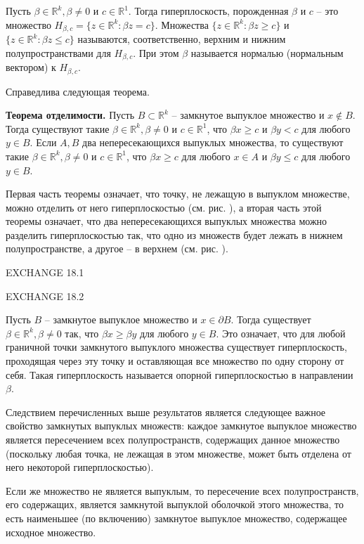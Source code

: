 Пусть $\beta\in\mathbb{R}^k, \beta\neq0$ и $c\in\mathbb{R}^1$. Тогда
гиперплоскость, порожденная $\beta$ и $c$ -- это множество
$H_{\beta,c}=\{z\in\mathbb{R}^k: \beta z=c\}$.
Множества $\{z\in\mathbb{R}^k: \beta z\geq c\}$ и
$\{z\in\mathbb{R}^k: \beta z\leq c\}$ называются, соответственно,
верхним и нижним полупространствами для $H_{\beta,c}$. При
этом $\beta$ называется нормалью (нормальным вектором) к
$H_{\beta,c}$.

Справедлива следующая теорема.

\textbf{Теорема отделимости.} Пусть $B\subset\mathbb{R}^k$ --
замкнутое выпуклое множество и $x\notin B$. Тогда существуют такие
$\beta\in\mathbb{R}^k, \beta\neq0$ и $c\in\mathbb{R}^1$, что $\beta x\geq c$ и
$\beta y<c$ для любого $y\in B$. Если $A,B$ два непересекающихся
выпуклых множества, то существуют такие
$\beta\in\mathbb{R}^k, \beta\neq0$ и $c\in\mathbb{R}^1$, что $\beta x\geq c$ для любого
$x\in A$ и
$\beta y \leq c$ для любого $y \in B$.

Первая часть теоремы означает, что точку, не лежащую в выпуклом множестве,
можно отделить от него гиперплоскостью (см. рис.  ), а вторая часть этой теоремы
означает, что два непересекающихся выпуклых
множества можно разделить гиперплоскостью так, что одно из множеств
будет лежать в нижнем полупространстве, а другое -- в верхнем (см. рис.   ).

EXCHANGE 18.1

EXCHANGE 18.2

Пусть $B$ -- замкнутое выпуклое множество и $x\in\partial B$. Тогда существует
$\beta\in\mathbb{R}^k, \beta\neq0$ так, что $\beta x\geq\beta y$ для любого $y\in B$.
Это означает, что для любой граничной точки замкнутого выпуклого множества существует
гиперплоскость, проходящая через эту точку и оставляющая все множество по одну сторону
от себя. Такая гиперплоскость называется опорной гиперплоскостью в направлении $\beta$.

Следствием перечисленных выше результатов является следующее важное свойство
замкнутых выпуклых множеств: каждое замкнутое выпуклое множество является
пересечением всех полупространств, содержащих данное множество (поскольку
любая точка, не лежащая в этом множестве, может быть отделена от него некоторой
гиперплоскостью).

Если же множество не является выпуклым, то пересечение всех полупространств,
его содержащих, является замкнутой выпуклой оболочкой этого множества, то
есть наименьшее (по включению) замкнутое выпуклое множество, содержащее исходное
множество.

